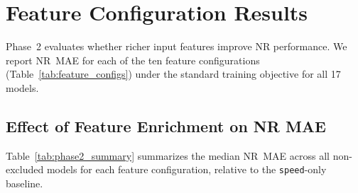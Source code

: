 \documentclass[a4paper]{cas-sc}
\begin{document}
\section{Feature Configuration Results}
\label{sec:results_features}

Phase~2 evaluates whether richer input features improve NR performance.
We report NR~MAE for each of the ten feature configurations
(Table~\ref{tab:feature_configs}) under the standard training objective
for all 17 models.

\subsection{Effect of Feature Enrichment on NR MAE}

Table~\ref{tab:phase2_summary} summarizes the median NR~MAE across
all non-excluded models for each feature configuration,
relative to the \texttt{speed}-only baseline.
\end{document}
